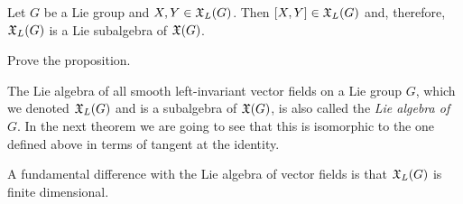 

\begin{proposition}
	Let $G$ be a Lie group and $X,Y\in\mathfrak{X}_L(G)$.
	Then $[X,Y]\in\mathfrak{X}_L(G)$ and, therefore, $\mathfrak{X}_L(G)$ is a Lie subalgebra of $\mathfrak{X}(G)$.
\end{proposition}
\begin{exercise}
	Prove the proposition.
\end{exercise}

\begin{remark}
	The Lie algebra of all smooth left-invariant vector fields on a Lie group $G$, which we denoted $\mathfrak{X}_L(G)$ and is a subalgebra of $\mathfrak{X}(G)$, is also called the \emph{Lie algebra of $G$}.
	In the next theorem we are going to see that this is isomorphic to the one defined above in terms of tangent at the identity.
\end{remark}

A fundamental difference with the Lie algebra of vector fields is that $\mathfrak{X}_L(G)$ is finite dimensional.

